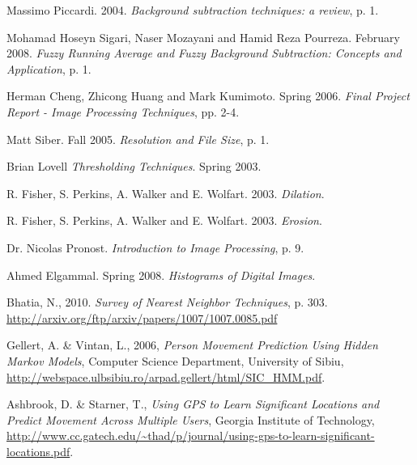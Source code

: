 \begin{thebibliography}{}



 Massimo Piccardi. 2004. \emph{Background subtraction techniques: a review}, p. 1.

 Mohamad Hoseyn Sigari, Naser Mozayani and Hamid Reza Pourreza. February 2008. \emph{Fuzzy Running Average and Fuzzy Background Subtraction: Concepts and Application}, p. 1.

 Herman Cheng, Zhicong Huang and Mark Kumimoto. Spring 2006. \emph{Final Project Report - Image Processing Techniques}, pp. 2-4.

 Matt Siber. Fall 2005. \emph{Resolution and File Size}, p. 1.

 Brian Lovell \emph{Thresholding Techniques}. Spring 2003.

 R. Fisher, S. Perkins, A. Walker and E. Wolfart. 2003. \emph{Dilation}.

 R. Fisher, S. Perkins, A. Walker and E. Wolfart. 2003. \emph{Erosion}.

 Dr. Nicolas Pronost. \emph{Introduction to Image Processing}, p. 9.

 Ahmed Elgammal. Spring 2008. \emph{Histograms of Digital Images}.

 Bhatia, N., 2010. \emph{Survey of Nearest Neighbor Techniques}, p. 303. \url{http://arxiv.org/ftp/arxiv/papers/1007/1007.0085.pdf}

 Gellert, A. \& Vintan, L., 2006, \emph{Person Movement Prediction Using Hidden Markov Models}, Computer Science Department, University of Sibiu, \url{http://webspace.ulbsibiu.ro/arpad.gellert/html/SIC_HMM.pdf}.

 Ashbrook, D. \& Starner, T., \emph{Using GPS to Learn Significant Locations and Predict Movement Across Multiple Users}, Georgia Institute of Technology, \url{http://www.cc.gatech.edu/~thad/p/journal/using-gps-to-learn-significant-locations.pdf}.








\end{thebibliography}